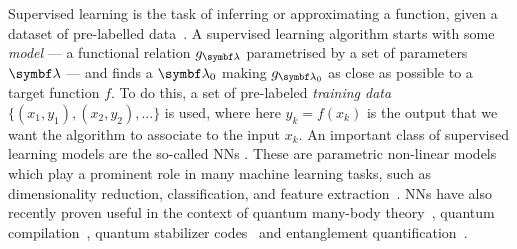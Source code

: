 Supervised learning is the task of inferring or approximating a function, given a dataset of pre-labelled data~\cite{bishop2006pattern,mohri2012foundations}.
A supervised learning algorithm starts with some \emph{model} --- a functional relation $g_{\bs\lambda}$ parametrised by a set of parameters $\bs\lambda$ --- and finds a $\bs\lambda_0$ making $g_{\bs\lambda_0}$ as close as possible to a target function $f$.
To do this, a set of pre-labeled \emph{training data} $\{ (x_1, y_1), (x_2,y_2), ...\}$ is used,
where here $y_k=f(x_k)$ is the output that we want the algorithm to associate to the input $x_k$.
An important class of supervised learning models are the so-called \acp{NN} \cite{hechtnielsen1989theory,haykin1998neural}.
These are parametric non-linear models which play a prominent role in many machine learning tasks, such as dimensionality reduction, classification, and feature extraction~\cite{hechtnielsen1989theory,haykin1998neural}.
\acp{NN} have also recently proven useful in the context of quantum many-body theory~\cite{amin2016quantum,wang2016discovering,hush2017machine,carleo2017solving,carrasquilla2017machine,torlai2017manybody,broecker2017quantum,deng2017quantum},
quantum compilation~\cite{swaddle2017generating}, quantum stabilizer codes~\cite{krastanov2017deep} and entanglement quantification~\cite{gray2017measuring}.

